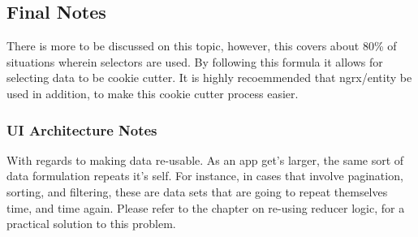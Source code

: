 \subsection{Final Notes}
There is more to be discussed on this topic, however, this covers about 80\% of
situations wherein selectors are used. By following this formula it allows for
selecting data to be cookie cutter. It is highly recoemmended that ngrx/entity
be used in addition, to make this cookie cutter process easier.

\subsubsection{UI Architecture Notes}
With regards to making data re-usable. As an app get's larger, the same sort
of data formulation repeats it's self. For instance, in cases that involve
pagination, sorting, and filtering, these are data sets that are going to
repeat themselves time, and time again. Please refer to the chapter on re-using
reducer logic, for a practical solution to this problem.
